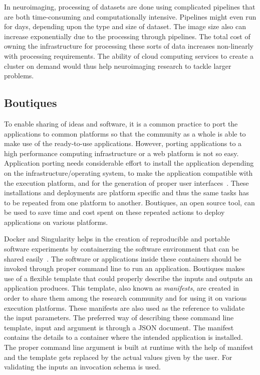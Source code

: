 In neuroimaging, processing of datasets are done using complicated pipelines that are both time-consuming and computationally intensive. Pipelines might even run for days, depending upon the type and size of dataset. The image size also can increase exponentially due to the processing through pipelines. The total cost of owning the infrastructure for processing these sorts of data increases non-linearly with processing requirements. The ability of cloud computing services to create a cluster on demand would thus help neuroimaging research to tackle larger problems.

\subsection{Boutiques}
To enable sharing of ideas and software, it is a common practice to port the applications to common platforms so that the community as a whole is able to make use of the ready-to-use applications. However, porting applications to a high performance computing infrastructure or a web platform is not so easy. Application porting needs considerable effort to install the application depending on the infrastructure/operating system, to make the application compatible with the execution platform, and for the generation of proper user interfaces~\cite{boutiques}. These installations and deployments are platform specific and thus the same tasks has to be repeated from one platform to another. Boutiques, an open source tool, can be used to save time and cost spent on these repeated actions to deploy applications on various platforms.

Docker and Singularity helps in the creation of reproducible and portable software experiments by containerzing the software environment that can be shared easily~\cite{boutiques}. The software or applications inside these containers should be invoked through proper command line to run an application. Boutiques makes use of a flexible template that could properly describe the inputs and outputs an application produces. This template, also known as \textit{manifests}, are created in order to share them among the research community and for using it on various execution platforms. These manifests are also used as the reference to validate the input parameters. The preferred way of describing these command line template, input and argument is through a JSON document. The manifest contains the details to a container where the intended application is installed. The proper command line argument is built at runtime with the help of manifest and the template gets replaced by the actual values given by the user. For validating the inputs an invocation schema is used.

